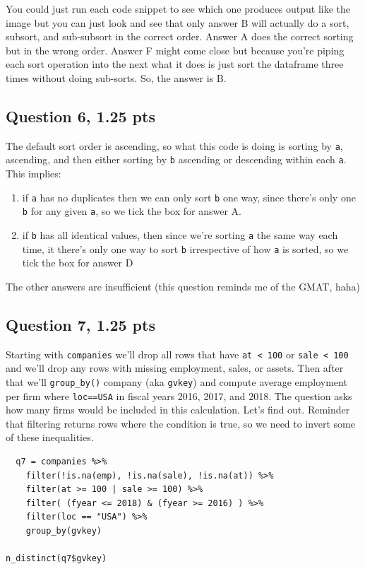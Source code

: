 \documentclass[11pt]{article}
\begin{document}
You could just run each code snippet to see which one produces output like the image but you can just look and see that only answer B will actually do a sort, subsort, and sub-subsort in the correct order.  Answer A does the correct sorting but in the wrong order.  Answer F might come close but because you're piping each sort operation into the next what it does is just sort the dataframe three times without doing sub-sorts.   So, the answer is B.

\subsection*{Question 6, 1.25 pts}
\label{sec:org7b6a1f5}
The default sort order is ascending, so what this code is doing is sorting by \texttt{a}, ascending, and then either sorting by \texttt{b} ascending or descending within each \texttt{a}.  This implies:

\begin{enumerate}
\item if \texttt{a} has no duplicates then we can only sort \texttt{b} one way, since there's only one \texttt{b} for any given \texttt{a}, so we tick the box for answer A.
\item if \texttt{b} has all identical values, then since we're sorting \texttt{a} the same way each time, it there's only one way to sort \texttt{b} irrespective of how \texttt{a} is sorted, so we tick the box for answer D
\end{enumerate}


The other answers are insufficient (this question reminds me of the GMAT, haha)

\newpage
\subsection*{Question 7, 1.25 pts}
\label{sec:org4bb064f}
Starting with \texttt{companies} we'll drop all rows that have \texttt{at < 100} or \texttt{sale < 100} and we'll drop any rows with missing employment, sales, or assets.  Then after that we'll \texttt{group\_by()} company (aka \texttt{gvkey}) and compute average employment per firm where \texttt{loc==USA} in fiscal years 2016, 2017, and 2018.  The question asks how many firms would be included in this calculation.  Let's find out.  Reminder that filtering returns rows where the condition is true, so we need to invert some of these inequalities.

\begin{verbatim}
  q7 = companies %>%
    filter(!is.na(emp), !is.na(sale), !is.na(at)) %>%
    filter(at >= 100 | sale >= 100) %>%
    filter( (fyear <= 2018) & (fyear >= 2016) ) %>%
    filter(loc == "USA") %>%
    group_by(gvkey)

n_distinct(q7$gvkey)
\end{verbatim}
\end{document}
